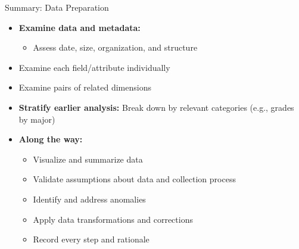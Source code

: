 \documentclass[aspectratio=169]{../latex_main/tntbeamer}  %
\begin{document}
\begin{frame}[c]{Summary: Data Preparation}

\begin{itemize}
    \item \textbf{Examine data and metadata:}
    \begin{itemize}
        \item Assess date, size, organization, and structure
    \end{itemize}
    \item Examine each field/attribute individually
    \item Examine pairs of related dimensions
    \item \textbf{Stratify earlier analysis:} Break down by relevant categories (e.g., grades by major)
    \item \textbf{Along the way:}
    \begin{itemize}
        \item Visualize and summarize data
        \item Validate assumptions about data and collection process
        \item Identify and address anomalies
        \item Apply data transformations and corrections
        \item Record every step and rationale
    \end{itemize}
\end{itemize}

\end{frame}
\end{document}
